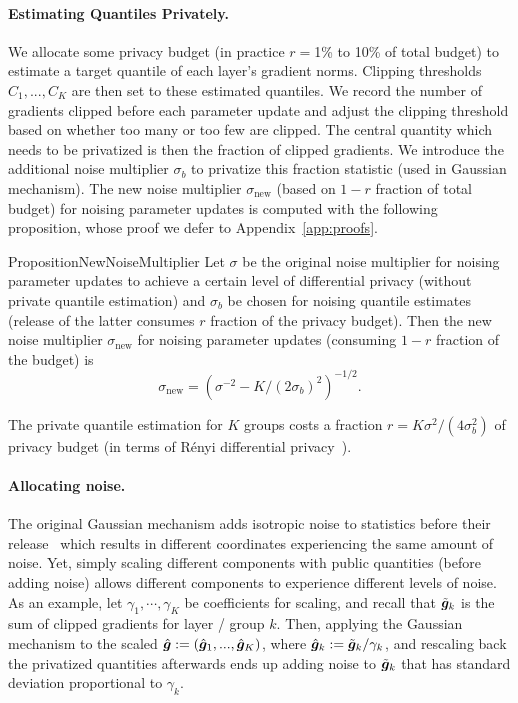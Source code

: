 \paragraph{Estimating Quantiles Privately.}
We allocate some privacy budget (in practice $r=$1\% to 10\% of total budget) to estimate a target quantile of each layer's gradient norms. 
Clipping thresholds $C_1, ..., C_K$ are then set to these estimated quantiles. 
We record the number of gradients clipped before each parameter update and adjust the clipping threshold based on whether too many or too few are clipped. 
The central quantity which needs to be privatized is then the fraction of clipped gradients.
We introduce the additional noise multiplier $\sigma_{b}$ to privatize this fraction statistic (used in Gaussian mechanism). 
The new noise multiplier $\sigma_\text{new}$ (based on $1-r$ fraction of total budget) for noising parameter updates is computed with the following proposition, whose proof we defer to Appendix~\ref{app:proofs}.


\begin{restatable}{Proposition}{NewNoiseMultiplier} \label{prop:noise-multiplier}
Let $\sigma$ be the original noise multiplier for noising parameter updates to achieve a certain level of differential privacy (without private quantile estimation) and $\sigma_b$ be chosen for noising quantile estimates (release of the latter consumes $r$ fraction of the privacy budget). %
Then the new noise multiplier $\sigma_{\text{new}}$ for noising parameter updates (consuming $1-r$ fraction of the budget) is
\begin{equation}
\sigma_{\text{new}} = (\sigma^{-2}- K/(2\sigma_b)^2)^{-1/2}. \label{eq:sigma_new_sigma_b}    
\end{equation}
\end{restatable}
\begin{Remark}
The private quantile estimation for $K$ groups costs  a fraction $r = K\sigma^2/(4\sigma_b^2)$ of privacy budget (in terms of R\'enyi differential privacy~\citep{mironov2017renyi}). 
\end{Remark}

\paragraph{Allocating noise.}
The original Gaussian mechanism adds isotropic noise to statistics before their release~\citep{dwork2014algorithmic} which results in different coordinates experiencing the same amount of noise.
Yet, simply scaling different components with public quantities (before adding noise) allows different components to experience different levels of noise. 
As an example, let $\gamma_1, \cdots, \gamma_K$ be coefficients for scaling, and recall that $\tilde{\bm{g}}_k$ is the sum of clipped gradients for layer / group $k$. 
Then, applying the Gaussian mechanism to the scaled $\hat{\bm{g}} := (\hat{\bm{g}}_1, ..., \hat{\bm{g}}_K)$, where $\hat{\bm{g}}_k:={\tilde{\bm{g}}_k}/{\gamma_k}$, and rescaling back the privatized quantities afterwards ends up adding noise to $\tilde{\bm{g}}_k$ that has standard deviation proportional to $\gamma_k$.


